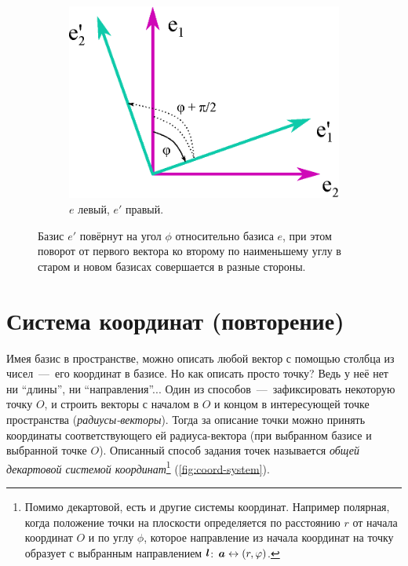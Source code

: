 \documentclass[a4paper,12pt]{article}
\begin{document}
\begin{figure}
\begin{subfigure}[b]{0.4\columnwidth}
      \includegraphics[width=\textwidth]{turned-ortonorm-basis2_left1}
      \caption{$e$ левый, $e'$ правый.}
    \end{subfigure}  %
    
    \caption{Базис $e'$ повёрнут на угол $\phi$ относительно базиса $e$, при этом поворот от первого вектора ко второму по наименьшему углу в старом и новом базисах совершается в разные стороны.}
    \label{fig:turned-ortonorm-basis2}
  \end{figure}


  \section{Система координат (повторение)}
  
  Имея базис в пространстве, можно описать любой вектор с помощью столбца из чисел~---~его координат в базисе.
  Но как описать просто точку?
  Ведь у неё нет ни ``длины'', ни ``направления''...
  Один из способов~---~зафиксировать некоторую точку $O$, и строить векторы с началом в $O$ и концом в интересующей точке пространства (\emph{радиусы-векторы}).
  Тогда за описание точки можно принять координаты соответствующего ей радиуса-вектора (при выбранном базисе и выбранной точке $O$).
  Описанный способ задания точек называется \emph{общей декартовой системой координат}\footnote{Помимо декартовой, есть и другие системы координат. Например полярная, когда положение точки на плоскости определяется по расстоянию $r$ от начала координат $O$ и по углу $\phi$, которое направление из начала координат на точку образует с выбранным направлением $\boldsymbol l$: $\bds a \hm\leftrightarrow (r, \phi)$.} (\ref{fig:coord-system}).
  
\end{document}

